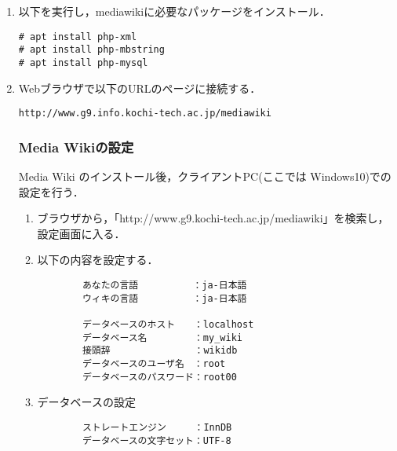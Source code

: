 \documentclass[a4j,titlepage]{jarticle}
\begin{document}
\begin{itemize}
\begin{enumerate}
\item 以下を実行し，mediawikiに必要なパッケージをインストール．
\begin{screen}
\begin{center}
\begin{verbatim}
# apt install php-xml
# apt install php-mbstring
# apt install php-mysql
\end{verbatim}
\end{center}
\end{screen}

\item Webブラウザで以下のURLのページに接続する．
\begin{screen}
\begin{center}
\begin{verbatim}
http://www.g9.info.kochi-tech.ac.jp/mediawiki
\end{verbatim}
\end{center}
\end{screen}


\subsubsection{Media Wikiの設定}
Media Wiki のインストール後，クライアントPC(ここでは Windows10)での設定を行う．\\

\begin{enumerate}
\item ブラウザから，「http://www.g9.kochi-tech.ac.jp/mediawiki」を検索し，設定画面に入る．

\item 以下の内容を設定する．
  \begin{center}
    \begin{screen}
\begin{verbatim}
        あなたの言語        　：ja-日本語
        ウィキの言語        　：ja-日本語

        データベースのホスト　　：localhost
        データベース名　　　　　：my_wiki
        接頭辞　　　　　　　　　：wikidb
        データベースのユーザ名　：root
        データベースのパスワード：root00
\end{verbatim}
    \end{screen}
  \end{center}
  
\item データベースの設定
  \begin{center}
    \begin{screen}
\begin{verbatim}
        ストレートエンジン　　　：InnDB
        データベースの文字セット：UTF-8
\end{verbatim}
    \end{screen}
  \end{center}



\end{enumerate}
\end{enumerate}
\end{itemize}
\end{document}
